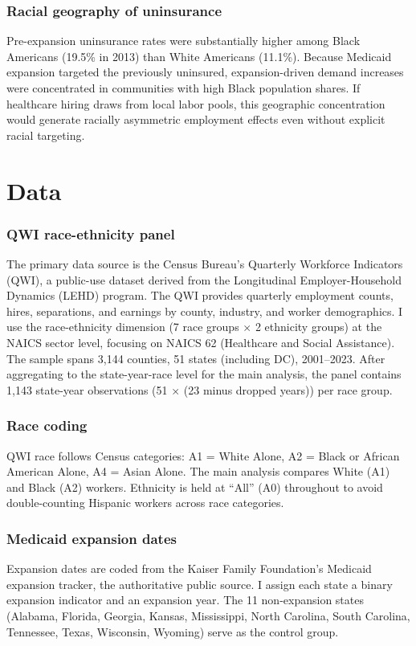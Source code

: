 \documentclass[12pt]{article}
\begin{document}
\subsubsection*{Racial geography of uninsurance} Pre-expansion uninsurance rates were substantially higher among Black Americans (19.5\% in 2013) than White Americans (11.1\%). Because Medicaid expansion targeted the previously uninsured, expansion-driven demand increases were concentrated in communities with high Black population shares. If healthcare hiring draws from local labor pools, this geographic concentration would generate racially asymmetric employment effects even without explicit racial targeting.

\section{Data}
\label{sec:data}

\subsubsection*{QWI race-ethnicity panel} The primary data source is the Census Bureau's Quarterly Workforce Indicators (QWI), a public-use dataset derived from the Longitudinal Employer-Household Dynamics (LEHD) program. The QWI provides quarterly employment counts, hires, separations, and earnings by county, industry, and worker demographics. I use the race-ethnicity dimension (7 race groups $\times$ 2 ethnicity groups) at the NAICS sector level, focusing on NAICS 62 (Healthcare and Social Assistance). The sample spans 3,144 counties, 51 states (including DC), 2001--2023. After aggregating to the state-year-race level for the main analysis, the panel contains 1,143 state-year observations (51 $\times$ (23 minus dropped years)) per race group.

\subsubsection*{Race coding} QWI race follows Census categories: A1 = White Alone, A2 = Black or African American Alone, A4 = Asian Alone. The main analysis compares White (A1) and Black (A2) workers. Ethnicity is held at ``All'' (A0) throughout to avoid double-counting Hispanic workers across race categories.

\subsubsection*{Medicaid expansion dates} Expansion dates are coded from the Kaiser Family Foundation's Medicaid expansion tracker, the authoritative public source. I assign each state a binary expansion indicator and an expansion year. The 11 non-expansion states (Alabama, Florida, Georgia, Kansas, Mississippi, North Carolina, South Carolina, Tennessee, Texas, Wisconsin, Wyoming) serve as the control group.
\end{document}
